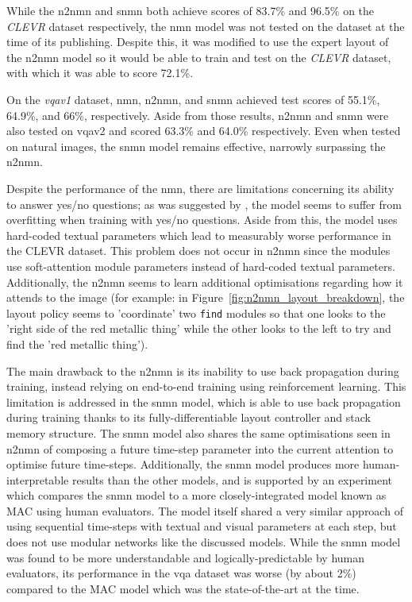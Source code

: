 While the \gls{n2nmn} and \gls{snmn} both achieve scores of 83.7\% and 96.5\% on the \textit{CLEVR} dataset respectively, the \gls{nmn} model was not tested on the dataset at the time of its publishing.
Despite this, it was modified to use the expert layout of the \gls{n2nmn} model so it would be able to train and test on the \textit{CLEVR} dataset, with which it was able to score 72.1\%\cite{hu_learning_2017}.

On the \textit{\gls{vqa}v1} dataset, \gls{nmn}, \gls{n2nmn}, and \gls{snmn} achieved test scores of 55.1\%, 64.9\%, and 66\%, respectively. Aside from those results, \gls{n2nmn} and \gls{snmn} were also tested on \gls{vqa}v2 and scored 63.3\% and 64.0\% respectively. Even when tested on natural images, the \gls{snmn} model remains effective, narrowly surpassing the \gls{n2nmn}.

Despite the performance of the \gls{nmn}, there are limitations concerning its ability to answer yes/no questions; as was suggested by \citeauthor{andreas_deep_2016}\cite{andreas_deep_2016}, the model seems to suffer from overfitting when training with yes/no questions.
Aside from this, the model uses hard-coded textual parameters which lead to measurably worse performance in the CLEVR dataset.
This problem does not occur in \gls{n2nmn} since the modules use soft-attention module parameters instead of hard-coded textual parameters.
Additionally, the \gls{n2nmn} seems to learn additional optimisations regarding how it attends to the image (for example: in Figure~\ref{fig:n2nmn_layout_breakdown}, the layout policy seems to 'coordinate' two \texttt{find} modules so that one looks to the 'right side of the red metallic thing' while the other looks to the left to try and find the 'red metallic thing').

The main drawback to the \gls{n2nmn} is its inability to use back propagation during training, instead relying on end-to-end training using reinforcement learning.
This limitation is addressed in the \gls{snmn} model, which is able to use back propagation during training thanks to its fully-differentiable layout controller and stack memory structure.
The \gls{snmn} model also shares the same optimisations seen in \gls{n2nmn} of composing a future time-step parameter into the current attention to optimise future time-steps.
Additionally, the \gls{snmn} model produces more human-interpretable results than the other models, and is supported by an experiment which compares the \gls{snmn} model to a more closely-integrated model known as MAC\cite{hudson_compositional_2018} using human evaluators.
The model itself shared a very similar approach of using sequential time-steps with textual and visual parameters at each step, but does not use modular networks like the discussed models.
While the \gls{snmn} model was found to be more understandable and logically-predictable by human evaluators, its performance in the \gls{vqa} dataset was worse (by about 2\%) compared to the MAC model which was the state-of-the-art at the time\cite{hu_explainable_2019}.

